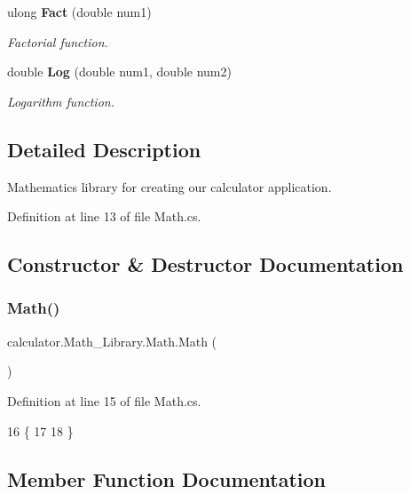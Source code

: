 \begin{DoxyCompactItemize}
ulong \textbf{ Fact} (double num1)
\begin{DoxyCompactList}\small\item\em Factorial function. \end{DoxyCompactList}\item 
double \textbf{ Log} (double num1, double num2)
\begin{DoxyCompactList}\small\item\em Logarithm function. \end{DoxyCompactList}\end{DoxyCompactItemize}


\subsection{Detailed Description}
Mathematics library for creating our calculator application. 



Definition at line 13 of file Math.\+cs.



\subsection{Constructor \& Destructor Documentation}
\mbox{\label{classcalculator_1_1_math___library_1_1_math_a96a230afc56ca8564b134c5b39527394}} 
\subsubsection{Math()}
{\footnotesize\ttfamily calculator.\+Math\+\_\+\+Library.\+Math.\+Math (\begin{DoxyParamCaption}{ }\end{DoxyParamCaption})}



Definition at line 15 of file Math.\+cs.


\begin{DoxyCode}
16         \{
17 
18         \}
\end{DoxyCode}


\subsection{Member Function Documentation}
\mbox{\label{classcalculator_1_1_math___library_1_1_math_ac53c06d474ea149e15eb5779421cb030}} 
